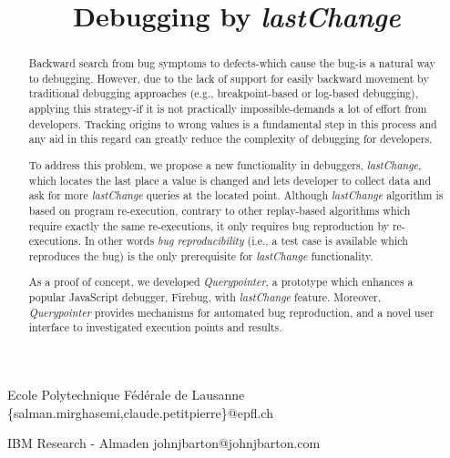 \documentclass[preprint]{sigplanconf}
\begin{document}
\copyrightdata{[to be supplied]} 

\preprintfooter{}   %

\title{Debugging by \textit{lastChange}}
\subtitle{}

           {Ecole Polytechnique F\'ed\'erale de Lausanne}
           {\{salman.mirghasemi,claude.petitpierre\}@epfl.ch}

           {IBM Research - Almaden}
           {johnjbarton@johnjbarton.com}

\maketitle

\begin{abstract}
Backward search from bug symptoms to defects-which cause the bug-is a
natural way to debugging. However, due to the lack of support for
easily backward movement by traditional debugging approaches (e.g.,
breakpoint-based or log-based debugging), applying this strategy-if it
is not practically impossible-demands a lot of effort from
developers. Tracking origins to wrong values is a fundamental step in
this process and any aid in this regard can greatly reduce the
complexity of debugging for developers.

To address this problem, we propose a new functionality in debuggers,
\textit{lastChange}, which locates the last place a value is changed
and lets developer to collect data and ask for more
\textit{lastChange} queries at the located point. Although
\textit{lastChange} algorithm is based on program re-execution,
contrary to other replay-based algorithms which require exactly the
same re-executions, it only requires bug reproduction by
re-executions. In other words \textit{bug reproducibility} (i.e., a
test case is available which reproduces the bug) is the only
prerequisite for \textit{lastChange} functionality.

As a proof of concept, we developed \textit{Querypointer}, a prototype
which enhances a popular JavaScript debugger, Firebug, with
\textit{lastChange} feature. Moreover, \textit{Querypointer} provides
mechanisms for automated bug reproduction, and a novel user interface
to investigated execution points and results.

\end{abstract}
\end{document}
